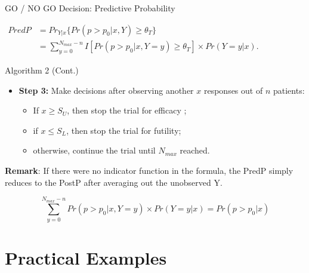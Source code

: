 \begin{frame}{GO / NO GO Decision: Predictive Probability}

\(\begin{aligned} PredP & = Pr_{Y|x} \{Pr(p>p_0|x, Y) \ge \theta_T \} \\  & = \sum\limits_{y=0}^{N_{max} -n} I[Pr(p>p_0|x, Y=y) \ge \theta_T] \times Pr(Y=y|x). \label{predp}  \end{aligned}\)

\begin{block}{Algorithm 2 (Cont.)}

\begin{itemize}
\tightlist
\item
  \textbf{Step 3:} Make decisions after observing another \(x\)
  responses out of \(n\) patients:

  \begin{itemize}
  \tightlist
  \item
    If \(x \ge S_U\), then stop the trial for efficacy ;
  \item
    if \(x \le S_L\), then stop the trial for futility;
  \item
    otherwise, continue the trial until \(N_{max}\) reached.
  \end{itemize}
\end{itemize}

\textbf{Remark}: If there were no indicator function in the formula, the
PredP simply reduces to the PostP after averaging out the unobserved Y.

\[\sum\limits_{y=0}^{N_{max} -n}  Pr(p>p_0|x, Y=y) \times Pr(Y=y|x) = Pr(p>p_0|x)\]

\end{block}

\end{frame}

\section{Practical Examples}\label{practical-examples}

